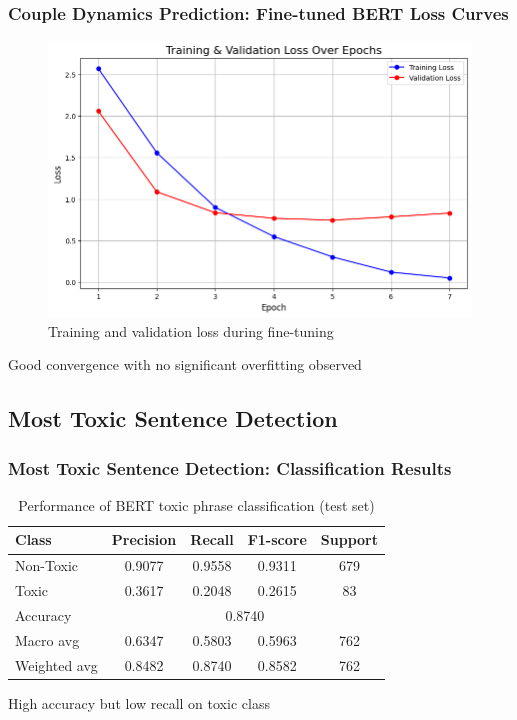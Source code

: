 \documentclass{beamer}
\begin{document}
\begin{frame}
\frametitle{Couple Dynamics Prediction: Fine-tuned BERT Loss Curves}

\begin{figure}
\centering
\includegraphics[width=0.7\linewidth]{figures/bert_finetuned_loss_curves.png}
\caption{Training and validation loss during fine-tuning}
\end{figure}

\vspace{0.1cm}
\begin{center}
\colorbox{green!10}{\parbox{0.8\linewidth}{\centering Good convergence with no significant overfitting observed}}
\end{center}

\end{frame}

\subsection{Most Toxic Sentence Detection}

\begin{frame}
\frametitle{Most Toxic Sentence Detection: Classification Results}

\begin{table}
\centering
\footnotesize
\begin{tabular}{lcccc}
\toprule
Class & Precision & Recall & F1-score & Support \\
\midrule
Non-Toxic & 0.9077 & 0.9558 & 0.9311 & 679 \\
Toxic & 0.3617 & 0.2048 & 0.2615 & 83 \\
\midrule
Accuracy & \multicolumn{4}{c}{0.8740} \\
Macro avg & 0.6347 & 0.5803 & 0.5963 & 762 \\
Weighted avg & 0.8482 & 0.8740 & 0.8582 & 762 \\
\bottomrule
\end{tabular}
\caption{Performance of BERT toxic phrase classification (test set)}
\end{table}

\vspace{0.2cm}
\begin{center}
\colorbox{blue!10}{\parbox{0.75\linewidth}{\centering High accuracy but low recall on toxic class}}
\end{center}

\end{frame}
\end{document}
